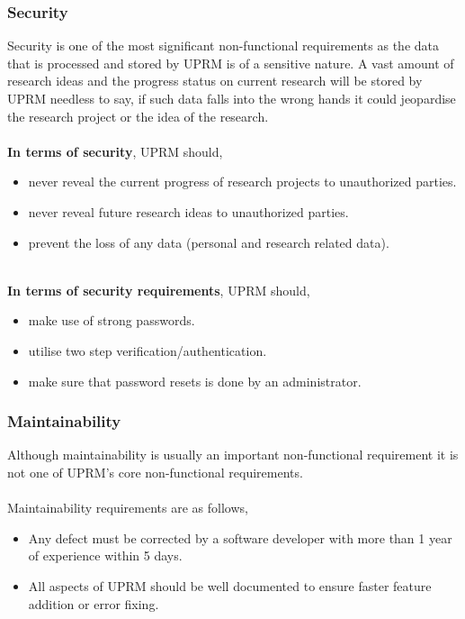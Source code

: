 \subsubsection{Security}
Security is one of the most significant non-functional requirements as the data that is processed and stored by UPRM is of a sensitive nature. 
A vast amount of research ideas and the progress status on current research will be stored by UPRM needless to say, if such data falls into the wrong hands it could jeopardise the research project or the idea of the research.\\  \\
\textbf{In terms of security}, UPRM should,
	\begin{itemize} 
		\item never reveal the current progress of research projects to unauthorized parties.
		\item never reveal future research ideas to unauthorized parties.
		\item prevent the loss of any data (personal and research related data). \\ \\
	\end{itemize}
\textbf{In terms of security requirements}, UPRM should,
	\begin{itemize} 
		\item make use of strong passwords.
		\item utilise two step verification/authentication.
		\item make sure that password resets is done by an administrator.
	\end{itemize}

\subsubsection{Maintainability}
	Although maintainability is usually an important non-functional requirement it is not one of UPRM's core non-functional requirements.\\ \\
Maintainability requirements are as follows,
\begin{itemize}
	\item Any defect must be corrected by a software developer with more than 1 year of experience within 5 days.
	\item All aspects of UPRM should be well documented to ensure faster feature addition or error fixing.
\end{itemize}


